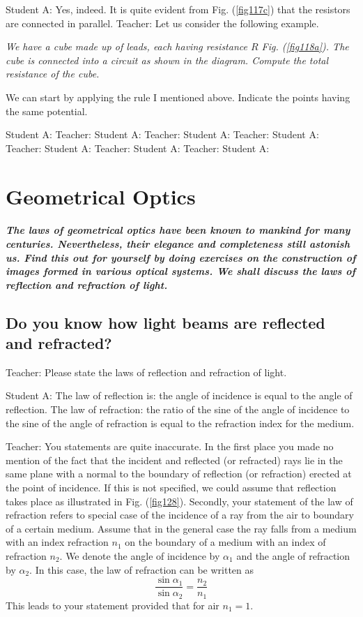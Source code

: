 \documentclass[a4paper,12pt]{book}
\begin{document}
{\sc Student A:} Yes, indeed. It is quite evident from Fig. (\ref{fig117c}) that the resistors are connected in parallel.
{\sc Teacher:} Let us consider the following example. {\it We have a cube made up of leads, each having resistance $R$ Fig. (\ref{fig118a}). The cube is connected into a circuit as shown in the diagram. Compute the total resistance of the cube.

We can start by applying the rule I mentioned above. Indicate the points having the same potential.
  
{\sc Student A:} 
{\sc Teacher:}
{\sc Student A:} 
{\sc Teacher:}
{\sc Student A:} 
{\sc Teacher:}
{\sc Student A:} 
{\sc Teacher:}
{\sc Student A:} 
{\sc Teacher:}
{\sc Student A:} 
{\sc Teacher:}
{\sc Student A:} 



\chapter{Geometrical Optics}
\paragraph{\it The laws of geometrical optics have been known to mankind for many centuries. Nevertheless, their elegance and completeness still astonish us. Find this out for yourself by doing exercises on the construction of images formed in various optical systems. We shall discuss the laws of reflection and refraction of light.}

\section{Do you know how light beams are reflected and refracted?}

{\sc Teacher:} Please state the laws of reflection and refraction of light.

{\sc Student A:} The law of reflection is: the angle of incidence is equal to the angle of reflection. The law of refraction: the ratio of the sine of the angle of incidence to the sine of the angle of refraction is equal to the refraction index for the medium.

{\sc Teacher:} You statements are quite inaccurate. In the first place you made no mention of the fact that the incident and reflected (or refracted) rays lie in the same plane with a normal to the boundary of reflection (or refraction) erected at the point of incidence. If this is not specified, we could assume that reflection takes place as illustrated in Fig. (\ref{fig128}). Secondly, your statement of the law of refraction refers to special case of the incidence of a ray from the air to boundary of a certain medium. Assume that in the general case the ray falls from a medium with an index refraction $n_{1}$ on the boundary of a medium with an index of refraction $n_{2}$. We denote the angle of incidence by $\alpha_{1}$ and the angle of refraction by $\alpha_{2}$. In this case, the law of refraction can be written as
\begin{equation}
\frac{\sin \alpha_{1}}{\sin \alpha_{2}} = \frac{n_{2}}{n_{1}}
\end{equation}
This leads to your statement provided that for air $n_{1}  = 1$.

}
\end{document}
